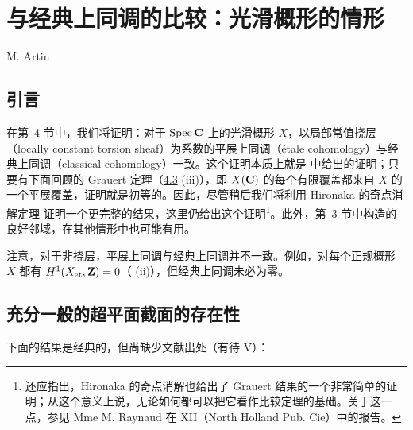 \chapter{与经典上同调的比较：光滑概形的情形}
\begin{center}
M. Artin
\end{center}
\label{sga4.exp.XI}

\setcounter{pageoriginal}{63}

\section{引言}\pageoriginale

在第~\hyperref[XI.sec4]{4} 节中，我们将证明：对于 $\operatorname{Spec}\mathbf{C}$ 上的光滑概形 $X$，以局部常值挠层（locally constant torsion sheaf）为系数的平展上同调（étale cohomology）与经典上同调（classical cohomology）一致。这个证明本质上就是 \cite{sga4.exp.XI.bib.1} 中给出的证明；只要有下面回顾的 Grauert 定理（\hyperref[XI.thm4.3]{4.3} (iii)），即 $X(\mathbf{C})$ 的每个有限覆盖都来自 $X$ 的一个平展覆盖，证明就是初等的。因此，尽管稍后我们将利用 Hironaka 的奇点消解定理 \cite{sga4.exp.XI.bib.3} 证明一个更完整的结果，这里仍给出这个证明\footnote[1]{还应指出，Hironaka 的奇点消解也给出了 Grauert 结果的一个非常简单的证明；从这个意义上说，无论如何都可以把它看作比较定理的基础。关于这一点，参见 Mme M. Raynaud 在  XII（North Holland Pub. Cie）中的报告。}。此外，第~\hyperref[XI.sec3]{3} 节中构造的良好邻域，在其他\pageoriginale 情形中也可能有用。

注意，对于非挠层，平展上同调与经典上同调并不一致。例如，对每个正规概形 $X$ 都有 $H^1(X_{\mathrm{et}},\mathbf{Z})=0$（ (ii)），但经典上同调未必为零。

\section{充分一般的超平面截面的存在性}

下面的结果是经典的，但尚缺少文献出处（有待 \EGA V）：

